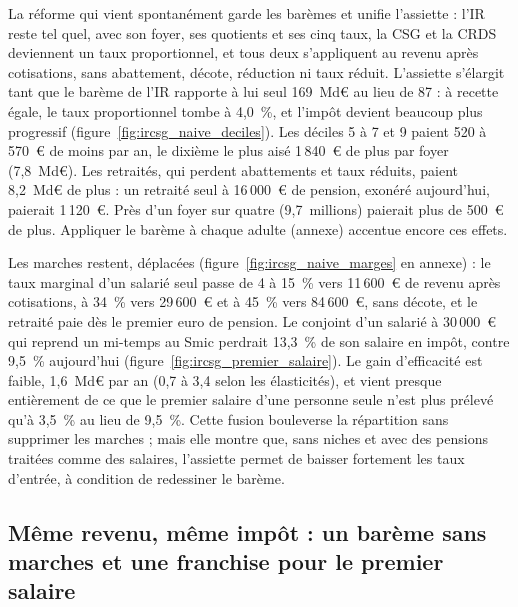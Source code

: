 La réforme qui vient spontanément garde les barèmes et unifie l'assiette : l'IR reste tel quel, avec son foyer, ses
quotients et ses cinq taux, la CSG et la CRDS deviennent un taux proportionnel, et tous deux s'appliquent au revenu
après cotisations, sans abattement, décote, réduction ni taux réduit. L'assiette s'élargit tant que le barème de l'IR
rapporte à lui seul 169~Md€ au lieu de 87 : à recette égale, le taux proportionnel tombe à 4,0~\%, et l'impôt devient
beaucoup plus progressif (figure~\ref{fig:ircsg_naive_deciles}). Les déciles 5 à 7 et 9 paient 520 à 570~€ de moins par
an, le dixième le plus aisé 1\,840~€ de plus par foyer (7,8~Md€). Les retraités, qui perdent abattements et taux
réduits, paient 8,2~Md€ de plus : un retraité seul à 16\,000~€ de pension, exonéré aujourd'hui, paierait 1\,120~€. Près
d'un foyer sur quatre (9,7~millions) paierait plus de 500~€ de plus. Appliquer le barème à chaque adulte (annexe)
accentue encore ces effets.


Les marches restent, déplacées (figure~\ref{fig:ircsg_naive_marges} en annexe) : le taux marginal d'un salarié seul
passe de 4 à 15~\% vers 11\,600~€ de revenu après cotisations, à 34~\% vers 29\,600~€ et à 45~\% vers 84\,600~€, sans
décote, et le retraité paie dès le premier euro de pension. Le conjoint d'un salarié à 30\,000~€ qui reprend un mi-temps
au Smic perdrait 13,3~\% de son salaire en impôt, contre 9,5~\% aujourd'hui (figure~\ref{fig:ircsg_premier_salaire}). Le
gain d'efficacité est faible, 1,6~Md€ par an (0,7 à 3,4 selon les élasticités), et vient presque entièrement de ce que
le premier salaire d'une personne seule n'est plus prélevé qu'à 3,5~\% au lieu de 9,5~\%. Cette fusion bouleverse la
répartition sans supprimer les marches ; mais elle montre que, sans niches et avec des pensions traitées comme des
salaires, l'assiette permet de baisser fortement les taux d'entrée, à condition de redessiner le barème.

\subsection{Même revenu, même impôt : un barème sans marches et une franchise pour le premier salaire}

